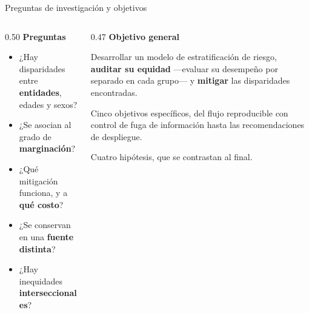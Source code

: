\documentclass[aspectratio=169,11pt]{beamer}
\newcommand{\resalta}[1]{{\color{vino}\bfseries #1}}
\begin{document}
\begin{frame}{Preguntas de investigación y objetivos}
  \vspace{0.3em}
  \begin{columns}[T,onlytextwidth]
    \begin{column}{0.50\textwidth}
      {\bfseries\color{vino} Preguntas}
      \vspace{0.3em}
      {\small
      \begin{itemize}\setlength\itemsep{0.3em}
        \item[\textcolor{naranja}{\bfseries P1}] ¿Hay disparidades entre
              \resalta{entidades}, edades y sexos?
        \item[\textcolor{naranja}{\bfseries P2}] ¿Se asocian al grado de
              \resalta{marginación}?
        \item[\textcolor{naranja}{\bfseries P3}] ¿Qué mitigación funciona, y a
              \resalta{qué costo}?
        \item[\textcolor{naranja}{\bfseries P4}] ¿Se conservan en una
              \resalta{fuente distinta}?
        \item[\textcolor{naranja}{\bfseries P5}] ¿Hay inequidades
              \resalta{interseccionales}?
      \end{itemize}}
    \end{column}
    \begin{column}{0.47\textwidth}
      {\bfseries\color{vino} Objetivo general}
      \vspace{0.3em}

      \begin{block}{}
        \small Desarrollar un modelo de estratificación de riesgo,
        \resalta{auditar su equidad} —evaluar su desempeño por separado en cada
        grupo— y \resalta{mitigar} las disparidades encontradas.
      \end{block}

      \vspace{0.5em}
      {\footnotesize\color{humo} Cinco objetivos específicos, del flujo
      reproducible con control de fuga de información hasta las recomendaciones
      de despliegue.\par
      \vspace{0.3em}
      Cuatro hipótesis, que se contrastan al final.}
    \end{column}
  \end{columns}
\end{frame}
\end{document}
